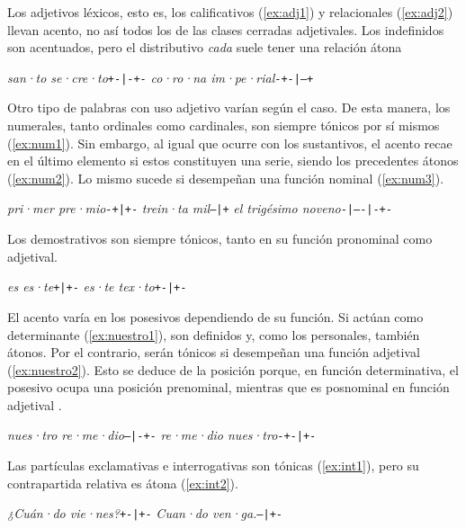 Los adjetivos léxicos, esto es, los calificativos (\ref{ex:adj1}) y relacionales (\ref{ex:adj2}) llevan acento, no así todos los de las clases cerradas adjetivales. Los indefinidos son acentuados, pero el distributivo \textit{cada} suele tener una relación átona \parencite[168.f]{navarrotomas2004}
\begin{exe}
	\ex\label{ex:adj1}\textit{san·to se·cre·to}\tab \texttt{+-|-+-}
	\ex\label{ex:adj2}\textit{co·ro·na im·pe·rial}\tab \texttt{-+-|--+}
\end{exe}

Otro tipo de palabras con uso adjetivo varían según el caso. De esta manera, los numerales, tanto ordinales como cardinales, son siempre tónicos por sí mismos (\ref{ex:num1}). Sin embargo, al igual que ocurre con los sustantivos, el acento recae en el último elemento si estos constituyen una serie, siendo los precedentes átonos (\ref{ex:num2}). Lo mismo sucede si desempeñan una función nominal (\ref{ex:num3}).
\begin{exe}
	\ex\label{ex:num1}\textit{pri·mer pre·mio}\tab \texttt{-+|+-}
	\ex\label{ex:num2}\textit{trein·ta mil}\tab  \texttt{--|+}
		\ex\label{ex:num3}\textit{el trigésimo noveno}\tab  \texttt{-|----|-+-}
\end{exe}

Los demostrativos son siempre tónicos, tanto en su función pronominal como adjetival.
\begin{exe}
	\ex \textit{es es·te}\tab \texttt{+|+-}
	\ex \textit{es·te tex·to}\tab \texttt{+-|+-}
\end{exe}

El acento varía en los posesivos dependiendo de su función. Si actúan como determinante (\ref{ex:nuestro1}), son definidos \parencite[18.2.1a]{rae2010a} y, como los personales, también átonos. Por el contrario, serán tónicos si desempeñan una función adjetival (\ref{ex:nuestro2}). Esto se deduce de la posición porque, en función determinativa, el posesivo ocupa una posición prenominal, mientras que es posnominal en función adjetival \parencite[18.2.2g]{rae2010a}.
\begin{exe}
	\ex\label{ex:nuestro1}\textit{nues·tro re·me·dio}\tab \texttt{--|-+-}
	\ex\label{ex:nuestro2}\textit{re·me·dio nues·tro}\tab \texttt{-+-|+-}
\end{exe}

Las partículas exclamativas e interrogativas son tónicas (\ref{ex:int1}), pero su contrapartida relativa es átona (\ref{ex:int2}).
\begin{exe}
	\ex\label{ex:int1}\textit{¿Cuán·do vie·nes?}\tab\texttt{+-|+-}
	\ex\label{ex:int2}\textit{Cuan·do ven·ga.}\tab\texttt{--|+-}
\end{exe}

